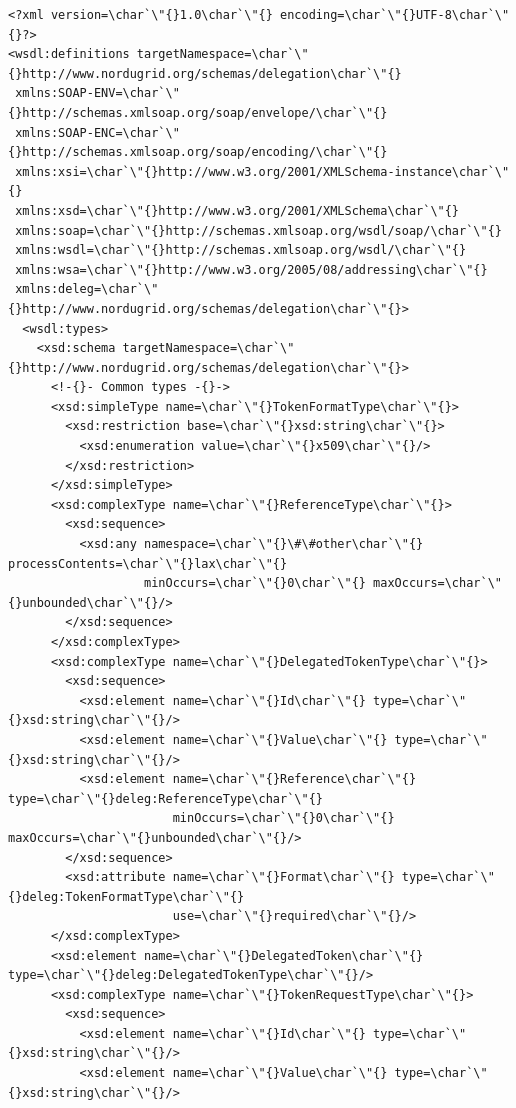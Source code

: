 \documentclass{article}                            %
\begin{document}
\begin{footnotesize}\begin{verbatim}
<?xml version=\char`\"{}1.0\char`\"{} encoding=\char`\"{}UTF-8\char`\"{}?>
<wsdl:definitions targetNamespace=\char`\"{}http://www.nordugrid.org/schemas/delegation\char`\"{}
 xmlns:SOAP-ENV=\char`\"{}http://schemas.xmlsoap.org/soap/envelope/\char`\"{}
 xmlns:SOAP-ENC=\char`\"{}http://schemas.xmlsoap.org/soap/encoding/\char`\"{}
 xmlns:xsi=\char`\"{}http://www.w3.org/2001/XMLSchema-instance\char`\"{}
 xmlns:xsd=\char`\"{}http://www.w3.org/2001/XMLSchema\char`\"{}
 xmlns:soap=\char`\"{}http://schemas.xmlsoap.org/wsdl/soap/\char`\"{}
 xmlns:wsdl=\char`\"{}http://schemas.xmlsoap.org/wsdl/\char`\"{}
 xmlns:wsa=\char`\"{}http://www.w3.org/2005/08/addressing\char`\"{}
 xmlns:deleg=\char`\"{}http://www.nordugrid.org/schemas/delegation\char`\"{}>
  <wsdl:types>
    <xsd:schema targetNamespace=\char`\"{}http://www.nordugrid.org/schemas/delegation\char`\"{}>
      <!-{}- Common types -{}->
      <xsd:simpleType name=\char`\"{}TokenFormatType\char`\"{}>
        <xsd:restriction base=\char`\"{}xsd:string\char`\"{}>
          <xsd:enumeration value=\char`\"{}x509\char`\"{}/>
        </xsd:restriction>
      </xsd:simpleType>
      <xsd:complexType name=\char`\"{}ReferenceType\char`\"{}>
        <xsd:sequence>
          <xsd:any namespace=\char`\"{}\#\#other\char`\"{} processContents=\char`\"{}lax\char`\"{}
                   minOccurs=\char`\"{}0\char`\"{} maxOccurs=\char`\"{}unbounded\char`\"{}/>
        </xsd:sequence>
      </xsd:complexType>
      <xsd:complexType name=\char`\"{}DelegatedTokenType\char`\"{}>
        <xsd:sequence>
          <xsd:element name=\char`\"{}Id\char`\"{} type=\char`\"{}xsd:string\char`\"{}/>
          <xsd:element name=\char`\"{}Value\char`\"{} type=\char`\"{}xsd:string\char`\"{}/>
          <xsd:element name=\char`\"{}Reference\char`\"{} type=\char`\"{}deleg:ReferenceType\char`\"{}
                       minOccurs=\char`\"{}0\char`\"{} maxOccurs=\char`\"{}unbounded\char`\"{}/>
        </xsd:sequence>
        <xsd:attribute name=\char`\"{}Format\char`\"{} type=\char`\"{}deleg:TokenFormatType\char`\"{}
                       use=\char`\"{}required\char`\"{}/>
      </xsd:complexType>
      <xsd:element name=\char`\"{}DelegatedToken\char`\"{} type=\char`\"{}deleg:DelegatedTokenType\char`\"{}/>
      <xsd:complexType name=\char`\"{}TokenRequestType\char`\"{}>
        <xsd:sequence>
          <xsd:element name=\char`\"{}Id\char`\"{} type=\char`\"{}xsd:string\char`\"{}/>
          <xsd:element name=\char`\"{}Value\char`\"{} type=\char`\"{}xsd:string\char`\"{}/>

\end{verbatim}
\end{footnotesize}
\end{document}
